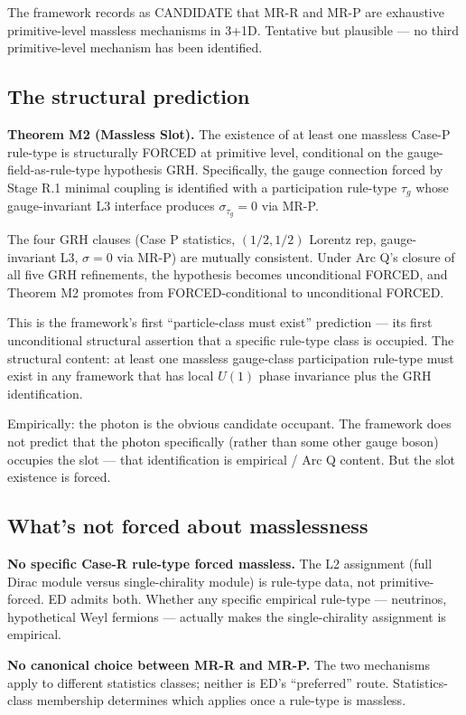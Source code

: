 \documentclass[11pt,a4paper]{article}
\begin{document}
The framework records as CANDIDATE that MR-R and MR-P are exhaustive primitive-level massless mechanisms in 3+1D. Tentative but plausible --- no third primitive-level mechanism has been identified.

\subsection{The structural prediction}

\textbf{Theorem M2 (Massless Slot).} The existence of at least one massless Case-P rule-type is structurally FORCED at primitive level, conditional on the gauge-field-as-rule-type hypothesis GRH. Specifically, the gauge connection forced by Stage R.1 minimal coupling is identified with a participation rule-type $\tau_g$ whose gauge-invariant L3 interface produces $\sigma_{\tau_g} = 0$ via MR-P.

The four GRH clauses (Case P statistics, $(1/2,1/2)$ Lorentz rep, gauge-invariant L3, $\sigma = 0$ via MR-P) are mutually consistent. Under Arc Q's closure of all five GRH refinements, the hypothesis becomes unconditional FORCED, and Theorem M2 promotes from FORCED-conditional to unconditional FORCED.

This is the framework's first ``particle-class must exist'' prediction --- its first unconditional structural assertion that a specific rule-type class is occupied. The structural content: at least one massless gauge-class participation rule-type must exist in any framework that has local $U(1)$ phase invariance plus the GRH identification.

Empirically: the photon is the obvious candidate occupant. The framework does not predict that the photon specifically (rather than some other gauge boson) occupies the slot --- that identification is empirical / Arc Q content. But the slot existence is forced.

\subsection{What's not forced about masslessness}

\textbf{No specific Case-R rule-type forced massless.} The L2 assignment (full Dirac module versus single-chirality module) is rule-type data, not primitive-forced. ED admits both. Whether any specific empirical rule-type --- neutrinos, hypothetical Weyl fermions --- actually makes the single-chirality assignment is empirical.

\textbf{No canonical choice between MR-R and MR-P.} The two mechanisms apply to different statistics classes; neither is ED's ``preferred'' route. Statistics-class membership determines which applies once a rule-type is massless.
\end{document}
